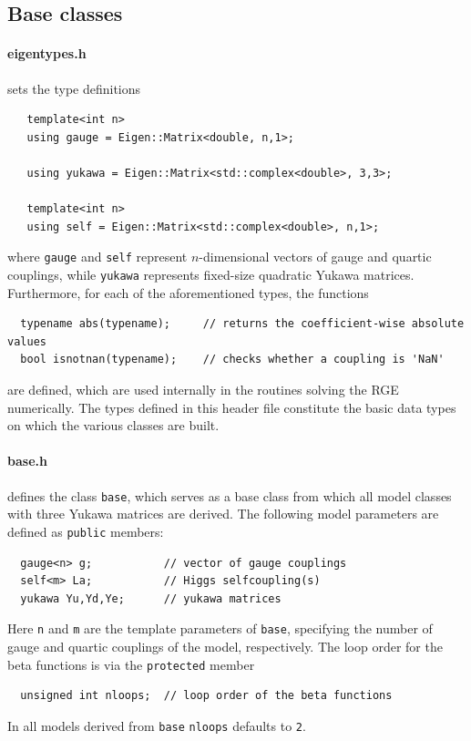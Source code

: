 \documentclass[11pt,a4paper]{article}
\begin{document}
\subsection{\label{sec::base} Base classes}
\paragraph{eigentypes.h}
sets the type definitions
\begin{lstlisting}
   template<int n>
   using gauge = Eigen::Matrix<double, n,1>;
   
   using yukawa = Eigen::Matrix<std::complex<double>, 3,3>;

   template<int n>
   using self = Eigen::Matrix<std::complex<double>, n,1>;
\end{lstlisting}
where \texttt{gauge} and \texttt{self} represent $n$-dimensional vectors of gauge and quartic couplings, while \texttt{yukawa} represents fixed-size quadratic Yukawa matrices.
Furthermore, for each of the aforementioned types, the functions
\begin{lstlisting}
  typename abs(typename);     // returns the coefficient-wise absolute values
  bool isnotnan(typename);    // checks whether a coupling is 'NaN'
\end{lstlisting}
are defined, which are used internally in the routines solving the RGE numerically.
The types defined in this header file constitute the basic data types on which the various classes are built.

\paragraph{base.h}
defines the class \texttt{base}, which serves as a base class from which all model classes with three Yukawa matrices are derived. The following model parameters are defined as \texttt{public} members:
\begin{lstlisting}
  gauge<n> g;           // vector of gauge couplings
  self<m> La;           // Higgs selfcoupling(s)
  yukawa Yu,Yd,Ye;      // yukawa matrices
\end{lstlisting}
Here \texttt{n} and \texttt{m} are the template parameters of \texttt{base}, specifying the number of gauge and quartic couplings of the model, respectively.
The loop order for the beta functions is via the \texttt{protected} member
\begin{lstlisting}
  unsigned int nloops;  // loop order of the beta functions
\end{lstlisting}
In all models derived from \texttt{base} \texttt{nloops} defaults to \texttt{2}.
\end{document}

